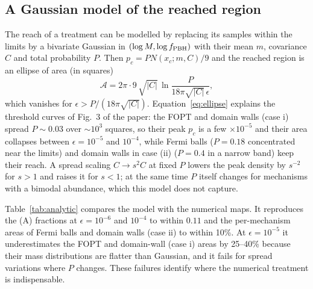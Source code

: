 \documentclass[aps,prd,onecolumn,superscriptaddress,nofootinbib,floatfix]{revtex4-2}
\newcommand{\fpbh}{f_{\rm PBH}}
\begin{document}
\subsection{A Gaussian model of the reached region}

The reach of a treatment can be modelled by replacing its samples within the limits by a bivariate Gaussian in $(\log M,\log\fpbh)$ with their mean $m$, covariance $C$ and total probability $P$. Then $p_c=PN(x_c;m,C)/9$ and the reached region is an ellipse of area (in squares)
\begin{equation}
\mathcal{A}=2\pi\cdot9\,\sqrt{|C|}\,\ln\frac{P}{18\pi\sqrt{|C|}\,\epsilon},
\label{eq:ellipse}
\end{equation}
which vanishes for $\epsilon>P/(18\pi\sqrt{|C|})$. Equation~\eqref{eq:ellipse} explains the threshold curves of Fig.~3 of the paper: the FOPT and domain walls (case i) spread $P\sim0.03$ over $\sim10^3$ squares, so their peak $p_c$ is a few $\times10^{-5}$ and their area collapses between $\epsilon=10^{-5}$ and $10^{-4}$, while Fermi balls ($P=0.18$ concentrated near the limits) and domain walls in case (ii) ($P=0.4$ in a narrow band) keep their reach. A spread scaling $C\to s^2C$ at fixed $P$ lowers the peak density by $s^{-2}$ for $s>1$ and raises it for $s<1$; at the same time $P$ itself changes for mechanisms with a bimodal abundance, which this model does not capture.

Table~\ref{tab:analytic} compares the model with the numerical maps. It reproduces the (A) fractions at $\epsilon=10^{-6}$ and $10^{-4}$ to within $0.11$ and the per-mechanism areas of Fermi balls and domain walls (case ii) to within 10\%. At $\epsilon=10^{-5}$ it underestimates the FOPT and domain-wall (case i) areas by 25--40\% because their mass distributions are flatter than Gaussian, and it fails for spread variations where $P$ changes. These failures identify where the numerical treatment is indispensable.
\end{document}
